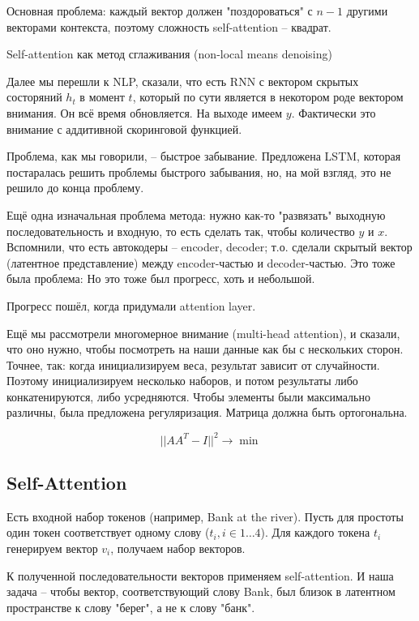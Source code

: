 \documentclass[a4paper,12pt]{article}
\begin{document}
Основная проблема: каждый вектор должен "поздороваться" с $ n-1 $ другими векторами контекста, поэтому сложность self-attention -- квадрат.

Self-attention как метод сглаживания (non-local means denoising)

Далее мы перешли к NLP, сказали, что есть RNN с вектором скрытых состоряний $ h_t $ в момент $ t $, который по сути является в некотором роде вектором внимания.
Он всё время обновляется.
На выходе имеем $ y $.
Фактически это внимание с аддитивной скоринговой функцией.

Проблема, как мы говорили, -- быстрое забывание.
Предложена LSTM, которая постаралась решить проблемы быстрого забывания, но, на мой взгляд, это не решило до конца проблему.

Ещё одна изначальная проблема метода: нужно как-то "развязать" выходную последовательность и входную, то есть сделать так, чтобы количество $ y $ и $ x $.
Вспомнили, что есть автокодеры -- encoder, decoder; т.о. сделали скрытый вектор (латентное представление) между encoder-частью и decoder-частью.
Это тоже была проблема: 
Но это тоже был прогресс, хоть и небольшой.

Прогресс пошёл, когда придумали attention layer.

Ещё мы рассмотрели многомерное внимание (multi-head attention), и сказали, что оно нужно, чтобы посмотреть на наши данные как бы с нескольких сторон.
Точнее, так: когда инициализируем веса, результат зависит от случайности.
Поэтому инициализируем несколько наборов, и потом результаты либо конкатенируются, либо усредняются.
Чтобы элементы были максимально различны, была предложена регуляризация.
Матрица должна быть ортогональна.

\[  || AA^T - I || ^2 \to \min  \]

\subsection{Self-Attention}

Есть входной набор токенов (например, Bank at the river).
Пусть для простоты один токен соответствует одному слову ($ t_i, i \in 1 \dots 4 $).
Для каждого токена $ t_i $ генерируем вектор $ v_i $, получаем набор векторов.

К полученной последовательности векторов применяем self-attention.
И наша задача -- чтобы вектор, соответствующий слову Bank, был близок в латентном пространстве к слову "берег"\hspace*{0pt}, а не к слову "банк".
\end{document}
